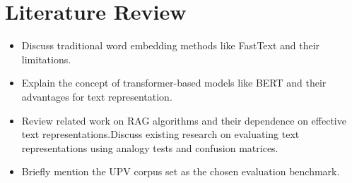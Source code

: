 
\chapter{Literature Review\label{chap:literature_review}}

\begin{itemize}
    \item Discuss traditional word embedding methods like FastText and their limitations.
    \item Explain the concept of transformer-based models like BERT and their advantages for text representation.
    \item Review related work on RAG algorithms and their dependence on effective text representations.Discuss existing research on evaluating text representations using analogy tests and confusion matrices.
    \item Briefly mention the UPV corpus set as the chosen evaluation benchmark.
\end{itemize}